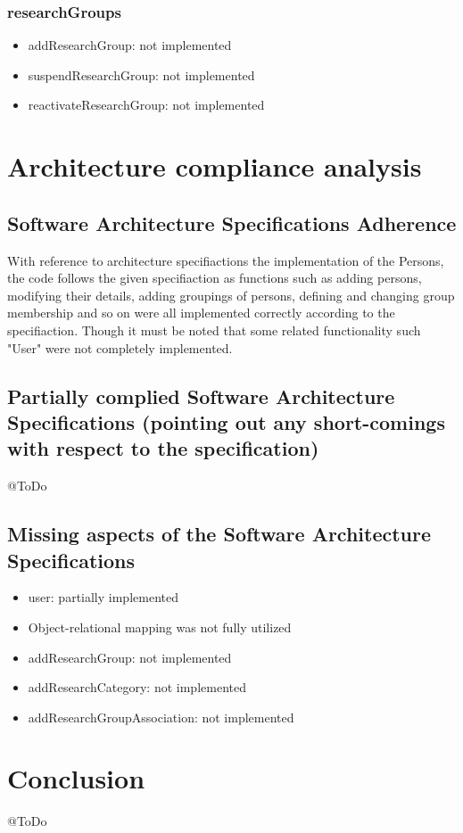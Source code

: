 \documentclass{article}
\begin{document}
		\subsubsection{researchGroups}
			\begin{itemize}
			\item addResearchGroup: not implemented
			\item suspendResearchGroup: not implemented
			\item reactivateResearchGroup: not implemented
			\end{itemize}

   \newpage

\section{Architecture compliance analysis}
     \subsection{Software Architecture Specifications Adherence}
	With reference to architecture specifiactions the implementation of the Persons, the code follows the given specifiaction as functions such as adding persons, modifying their details, adding groupings of persons, defining and changing group membership and so on were all implemented correctly according to the specifiaction. Though it must be noted that some related functionality such "User" were not completely implemented.

     \subsection{Partially complied Software Architecture Specifications (pointing out any short-comings with respect to the specification)}

     @ToDo

     \subsection{Missing aspects of the Software Architecture Specifications}
	\begin{itemize}
		\item user: partially implemented
		\item Object-relational mapping was not fully utilized
		\item addResearchGroup: not implemented
		\item addResearchCategory: not implemented
		\item addResearchGroupAssociation: not implemented
	\end{itemize}

\section{Conclusion}

@ToDo
\end{document}
